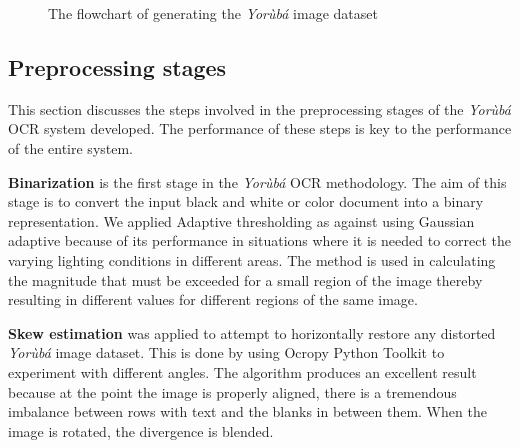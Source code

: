 \documentclass[review]{elsarticle}
\newcommand{\yor}{\textit{Yor\`ub\'a }}
\begin{document}
\begin{figure}
\centering
{}

\caption{The flowchart of generating the \yor image dataset}
\end{figure}

\subsection{Preprocessing stages}
This section discusses the steps involved in the preprocessing stages of the \yor OCR system developed. The performance of these steps is key to the performance of the entire system.

\textbf{Binarization} is the first stage in the \yor OCR methodology. The aim of this stage is to convert the input black and white or color document into a binary representation. We applied Adaptive thresholding as against using Gaussian adaptive because of its performance in situations where it is needed to correct the varying lighting conditions in different areas. The method is used in calculating the magnitude that must be exceeded for a small region of the image thereby resulting in different values for different regions of the same image. 

\textbf{Skew estimation} was applied to attempt to horizontally restore any distorted \yor image dataset. This is done by using Ocropy Python Toolkit to experiment with different angles. The algorithm produces an excellent result because at the point the image is properly aligned, there is a tremendous imbalance between rows with text and the blanks in between them. When the image is rotated, the divergence is blended.
\end{document}

